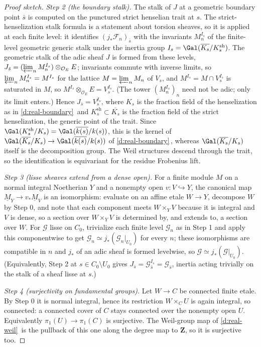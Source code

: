 \documentclass[11pt]{article}
\theoremstyle{plain}
\theoremstyle{definition}
\newcommand{\Cref}[1]{\hyperref[#1]{\ref{#1}}\,\hyperref[#1]{\nameref*{#1}}}
\begin{document}
\begin{proof}[Proof sketch]
\emph{Step 2 (the boundary stalk).}  The stalk of $J$ at a geometric
boundary point $\bar s$ is computed on the punctured strict henselian
trait at $s$.  The strict-henselization stalk formula is a statement
about torsion sheaves, so it is applied at each finite level:  it
identifies $(j_*\mathcal F_n)_{\bar s}$ with the invariants $M_n^{I_s}$ of
the finite-level geometric generic stalk under the inertia group
$I_s=\Gal(\overline{K_s}/K_s^{\mathrm{sh}})$.  The geometric stalk of the
adic sheaf $J$ is formed from these levels,
$J_{\bar s}=(\varprojlim_nM_n^{I_s})\otimes_{\mathcal O_E}E$;  invariants
commute with inverse limits, so $\varprojlim_nM_n^{I_s}=M^{I_s}$ for the
lattice $M=\varprojlim_nM_n$ of $V_s$, and $M^{I_s}=M\cap V_s^{I_s}$ is
saturated in $M$, so $M^{I_s}\otimes_{\mathcal O_E}E=V_s^{I_s}$.  (The
tower $(M_n^{I_s})_n$ need not be adic;  only its limit enters.)  Hence
$J_{\bar s}=V_s^{I_s}$,
where $K_s$ is the fraction field of the henselization as in
\Cref{d:real-boundary} and $K_s^{\mathrm{sh}}\subset\overline{K_s}$ is
the fraction field of the strict henselization, the generic point of the
trait.  Since $\Gal(K_s^{\mathrm{sh}}/K_s)=\Gal(\overline{k(s)}/k(s))$,
this is the kernel of
$\Gal(\overline{K_s}/K_s)\to\Gal(\overline{k(s)}/k(s))$ of
\Cref{d:real-boundary}, whereas $\Gal(\overline{K_s}/K_s)$ itself is the
decomposition group.
The Weil structures descend through the trait, so the identification is
equivariant for the residue Frobenius lift.

\emph{Step 3 (lisse sheaves extend from a dense open).}  For a finite
module $M$ on a normal integral Noetherian $Y$ and a nonempty open
$v:V\hookrightarrow Y$, the canonical map
$\underline M_Y\to v_*\underline M_V$ is an isomorphism:  evaluate on an
affine etale $W\to Y$, decompose $W$ by Step 0, and note that each
component meets $W\times_YV$ because it is integral and $V$ is dense, so
a section over $W\times_YV$ is determined by, and extends to, a section
over $W$.  For $\mathcal G$ lisse on $C_0$, trivialize each finite level
$\mathcal G_n$ as in Step 1 and apply this componentwise to get
$\mathcal G_n\simeq j_*(\mathcal G_n|_{U_0})$ for every $n$;  these
isomorphisms are compatible in $n$ and $j_*$ of an adic sheaf is formed
levelwise, so $\mathcal G\simeq j_*(\mathcal G|_{U_0})$.  (Equivalently,
Step 2 at $s\in C_0\setminus U_0$ gives
$J_{\bar s}=\mathcal G_{\bar s}^{I_s}=\mathcal G_{\bar s}$, inertia acting
trivially on the stalk of a sheaf lisse at $s$.)

\emph{Step 4 (surjectivity on fundamental groups).}  Let $W\to C$ be
connected finite etale.  By Step 0 it is normal integral, hence its
restriction $W\times_CU$ is again integral, so connected:  a connected
cover of $C$ stays connected over the nonempty open $U$.  Equivalently
$\pi_1(U)\to\pi_1(C)$ is surjective.  The Weil-group map of
\Cref{d:real-weil} is the pullback of this one along the degree map to
$\mathbf Z$, so it is surjective too.


\end{proof}
\end{document}
